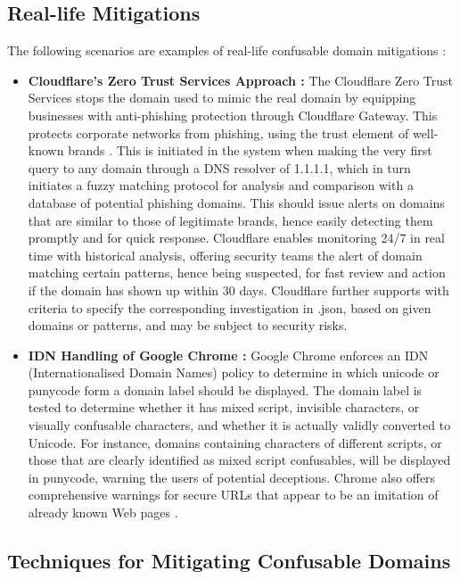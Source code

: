 \subsection{ Real-life Mitigations}

The following scenarios are examples of real-life confusable domain mitigations :

\begin{itemize}
    \item \textbf{Cloudflare's Zero Trust Services Approach :} The Cloudflare Zero Trust Services stops the domain used to mimic the real domain by equipping businesses with anti-phishing protection through Cloudflare Gateway. This protects corporate networks from phishing, using the trust element of well-known brands \cite{Cloudflare2023}. This is initiated in the system when making the very first query to any domain through a DNS resolver of 1.1.1.1, which in turn initiates a fuzzy matching protocol for analysis and comparison with a database of potential phishing domains. This should issue alerts on domains that are similar to those of legitimate brands, hence easily detecting them promptly and for quick response. Cloudflare enables monitoring 24/7 in real time with historical analysis, offering security teams the alert of domain matching certain patterns, hence being suspected, for fast review and action if the domain has shown up within 30 days. Cloudflare further supports with criteria to specify the corresponding investigation in .json, based on given domains or patterns, and may be subject to security risks.

     \item \textbf{IDN Handling of Google Chrome : }Google Chrome enforces an IDN (Internationalised Domain Names) policy to determine in which unicode or punycode form a domain label should be displayed. The domain label is tested to determine whether it has mixed script, invisible characters, or visually confusable characters, and whether it is actually validly converted to Unicode. For instance, domains containing characters of different scripts, or those that are clearly identified as mixed script confusables, will be displayed in punycode, warning the users of potential deceptions. Chrome also offers comprehensive warnings for secure URLs that appear to be an imitation of already known Web pages \cite{ChromiumIDN}.
     
\end{itemize}

\subsection{Techniques for Mitigating Confusable Domains}

